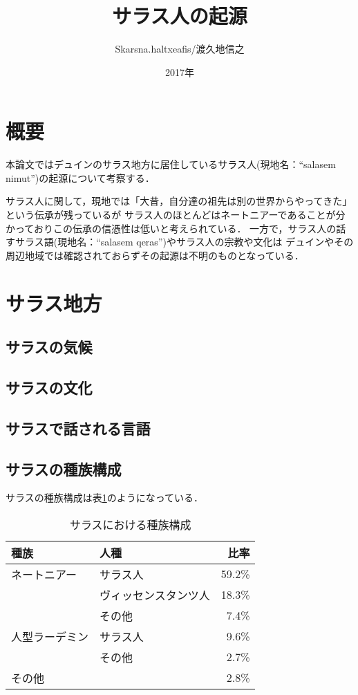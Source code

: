 \documentclass[11pt,a4j]{jarticle}
\begin{document}
{
\title{\Huge サラス人の起源}
\author{Skarsna.haltxeafis/渡久地信之}
\date{2017年}
}
\maketitle

\thispagestyle{empty}
\newpage
\setcounter{page}{1}

\section{概要}
本論文ではデュインのサラス地方に居住しているサラス人(現地名：``salasem nimut'')の起源について考察する．

サラス人に関して，現地では「大昔，自分達の祖先は別の世界からやってきた」という伝承が残っているが
サラス人のほとんどはネートニアーであることが分かっておりこの伝承の信憑性は低いと考えられている．
一方で，サラス人の話すサラス語(現地名：``salasem qeras'')やサラス人の宗教や文化は
デュインやその周辺地域では確認されておらずその起源は不明のものとなっている．

\section{サラス地方}
\subsection{サラスの気候}
\subsection{サラスの文化}
\subsection{サラスで話される言語}

\subsection{サラスの種族構成}
サラスの種族構成は表\ref{calass_species}のようになっている．
\begin{table}[htbp]
 \begin{center}
  \caption{サラスにおける種族構成}
  \label{calass_species}
  \begin{tabular}{llr}
   種族 & 人種 & 比率 \\ \hline \hline
   ネートニアー & サラス人 & 59.2\% \\
   & ヴィッセンスタンツ人 & 18.3\% \\
   & その他 & 7.4\% \\ \hline
   人型ラーデミン & サラス人 & 9.6\% \\
   & その他 & 2.7\% \\ \hline
   その他 & & 2.8\%
 \end{tabular}
\end{center}
\end{table}
\end{document}
